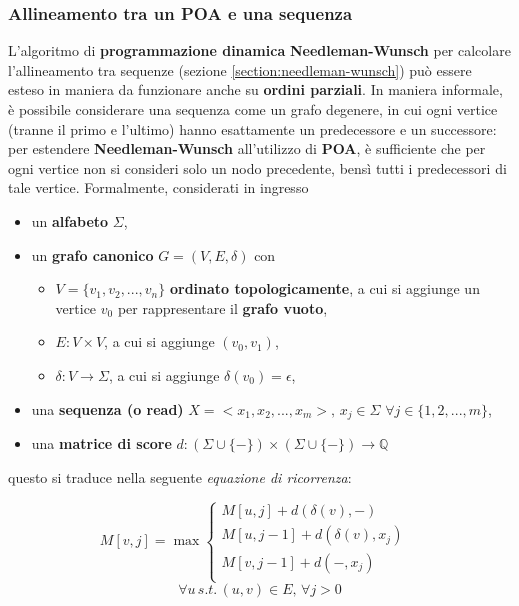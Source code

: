 \subsubsection{Allineamento tra un POA e una sequenza}
    L'algoritmo di \textbf{programmazione dinamica} \textbf{Needleman-Wunsch} per calcolare l'allineamento tra sequenze (sezione \ref{section:needleman-wunsch}) può essere esteso in maniera da funzionare anche su \textbf{ordini parziali}. In maniera informale, è possibile considerare una sequenza come un grafo degenere, in cui ogni vertice (tranne il primo e l'ultimo) hanno esattamente un predecessore e un successore: per estendere \textbf{Needleman-Wunsch} all'utilizzo di \textbf{POA}, è sufficiente che per ogni vertice non si consideri solo un nodo precedente, bensì tutti i predecessori di tale vertice. Formalmente, considerati in ingresso
    \begin{itemize}
        \item un \textbf{alfabeto} $\Sigma$,
        \item un \textbf{grafo canonico} $G = (V, E, \delta)$ con 
        \begin{itemize}
            \item $V = \{v_1, v_2, ..., v_n\}$ \textbf{ordinato topologicamente}, a cui si aggiunge un vertice $v_0$ per rappresentare il \textbf{grafo vuoto},
            \item $E : V \times V$, a cui si aggiunge $(v_0, v_1)$,
            \item $\delta: V \rightarrow \Sigma$, a cui si aggiunge $\delta(v_0) = \epsilon$,
        \end{itemize}
        \item una \textbf{sequenza (o read)} $X = <x_1, x_2, ..., x_m>, \, x_j \in \Sigma \, \, \forall j \in \{1, 2, ..., m\}$,
        \item una \textbf{matrice di score} $d : (\Sigma \cup \{-\}) \times (\Sigma \cup \{-\}) \rightarrow \mathbb{Q}$
    \end{itemize}
    questo si traduce nella seguente \emph{equazione di ricorrenza}:

    \begin{equation}
        M[v, j] = \max \begin{cases}
            M[u, j] + d(\delta(v), -) & \\
            M[u, j - 1] + d(\delta(v), x_j) & \\
            M[v, j - 1] + d(-, x_j) & \\
        \end{cases}
    \label{equation:poa}
    \end{equation}
    $$\forall u \, s.t. \, (u,v) \in E, \, \forall j > 0 $$

